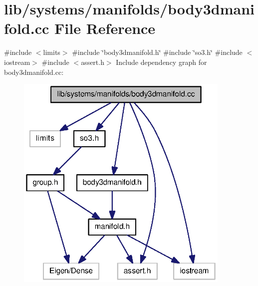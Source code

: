 \section{lib/systems/manifolds/body3dmanifold.cc \-File \-Reference}
\label{body3dmanifold_8cc}
{\ttfamily \#include $<$limits$>$}\*
{\ttfamily \#include \char`\"{}body3dmanifold.\-h\char`\"{}}\*
{\ttfamily \#include \char`\"{}so3.\-h\char`\"{}}\*
{\ttfamily \#include $<$iostream$>$}\*
{\ttfamily \#include $<$assert.\-h$>$}\*
\-Include dependency graph for body3dmanifold.\-cc\-:\nopagebreak
\begin{figure}[H]
\begin{center}
\leavevmode
\includegraphics[width=291pt]{body3dmanifold_8cc__incl}
\end{center}
\end{figure}
